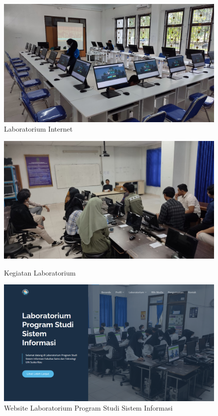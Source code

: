 \begin{figure}
	\centering
	\includegraphics[width=0.82\linewidth]{konten/gambar/lab-se.jpg}
	\caption{Laboratorium Internet \protect\cite{labsi2023}}
	\label{fig:lab-int}
\end{figure}

\begin{figure}
	\centering
	\includegraphics[width=0.82\linewidth]{konten/gambar/kegiatan.jpg}
	\caption{Kegiatan Laboratorium} \protect\cite{labsi2023}
	\label{fig:lab-sea}
\end{figure}

\begin{figure}
	\centering
	\includegraphics[width=0.82\linewidth]{konten//gambar/labsi.png}
	\caption{Website Laboratorium Program Studi Sistem Informasi \protect\cite{web-prodi}}
	\label{fig:enter-label}
\end{figure}

